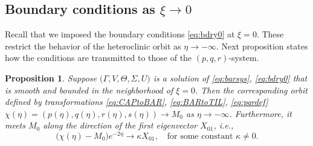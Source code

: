 \documentclass[a4paper,11pt]{article}
\def\tth{{\tilde{\theta}}}
\def\tu{{\tilde{u}}}
\newtheorem{proposition}{Proposition}[section]
\begin{document}
% 
% 

\subsection{Boundary conditions as $\xi \rightarrow 0$}
Recall that we imposed the boundary conditions \eqref{eq:bdry0} at $\xi=0$. These restrict the behavior of the heteroclinic orbit as $\eta \rightarrow -\infty$. Next proposition states how the conditions are transmitted to those of the $(p,q,r)$-system.

\begin{proposition} \label{prop1}
    Suppose $\big(\Gamma,V,\Theta,\Sigma,U\big)$ is a solution of \eqref{eq:barsys}, \eqref{eq:bdry0} that is smooth and bounded in the neighborhood of $\xi=0$. Then the corresponding orbit defined by transformations \eqref{eq:CAPtoBAR}, \eqref{eq:BARtoTIL}, \eqref{eq:pqrdef} $\chi(\eta) = (p(\eta), q(\eta), r(\eta),s(\eta)) \rightarrow M_0$ as $\eta \rightarrow -\infty$. Furthermore, it meets $M_0$ along the direction of the first eigenvector $X_{01}$, i.e.,
    \begin{equation} \label{eq:alpha}
     \big(\chi(\eta) - M_0 \big)e^{-2\eta} \rightarrow \kappa X_{01}, \quad \text{for some constant $\kappa\ne0$.}
    \end{equation}
\end{proposition}
\end{document}
